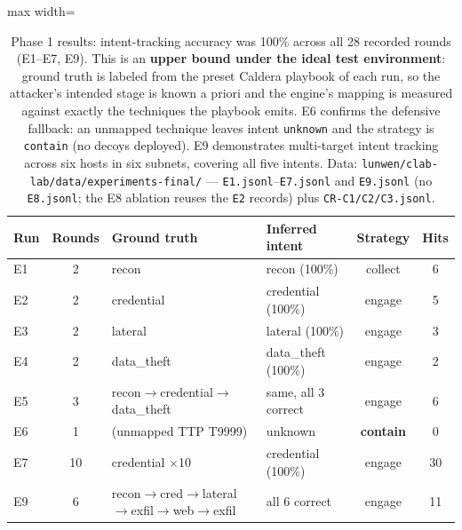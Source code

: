 \documentclass[preprints,article,accept,oneauthor]{Definitions/mdpi}
\newcommand{\act}[1]{\texttt{#1}}
\begin{document}
\begin{table}[ht]
\centering
\begin{adjustbox}{max width=\linewidth}\begin{tabular}{@{}lcllcc@{}}
\toprule
\textbf{Run} & \textbf{Rounds} & \textbf{Ground truth} & \textbf{Inferred intent} & \textbf{Strategy} & \textbf{Hits} \\
\midrule
E1 & 2 & recon & recon (100\%) & collect & 6 \\
E2 & 2 & credential & credential (100\%) & engage & 5 \\
E3 & 2 & lateral & lateral (100\%) & engage & 3 \\
E4 & 2 & data\_theft & data\_theft (100\%) & engage & 2 \\
E5 & 3 & recon$\to$credential$\to$data\_theft & same, all 3 correct & engage & 6 \\
E6 & 1 & (unmapped TTP T9999) & unknown & \textbf{contain} & 0 \\
E7 & 10 & credential $\times$10 & credential (100\%) & engage & 30 \\
E9 & 6 & recon$\to$cred$\to$lateral$\to$exfil$\to$web$\to$exfil & all 6 correct & engage & 11 \\
\bottomrule
\end{tabular}\end{adjustbox}
\caption{Phase 1 results: intent-tracking accuracy was 100\% across all 28
recorded rounds (E1--E7, E9). This is an \textbf{upper bound under the ideal test
environment}: ground truth is labeled from the preset Caldera playbook of
each run, so the attacker's intended stage is known a priori and the
engine's mapping is measured against exactly the techniques the playbook
emits. E6 confirms the defensive fallback: an unmapped technique
leaves intent \act{unknown} and the strategy is \act{contain} (no decoys
deployed). E9 demonstrates multi-target intent tracking across six hosts in
six subnets, covering all five intents. Data:
\texttt{lunwen/clab-lab/data/experiments-final/} ---
\texttt{E1.jsonl}--\texttt{E7.jsonl} and \texttt{E9.jsonl} (no
\texttt{E8.jsonl}; the E8 ablation reuses the \texttt{E2} records) plus
\texttt{CR-C1/C2/C3.jsonl}.}
\label{tab:results}
\end{table}
\end{document}
